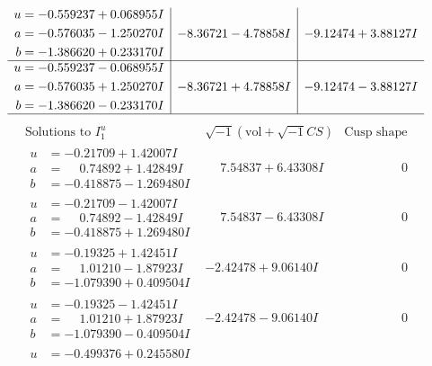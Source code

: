 \documentclass[1p]{elsarticle_modified}
\theoremstyle{definition}
\newcommand{\I}{\sqrt{-1}}
\begin{document}
$$\begin{array}{c|c|c}
\begin{aligned}
u &= -0.559237 + 0.068955 I \\
a &= -0.576035 - 1.250270 I \\
b &= -1.386620 + 0.233170 I\end{aligned}
 & -8.36721 - 4.78858 I & -9.12474 + 3.88127 I \\ \hline\begin{aligned}
u &= -0.559237 - 0.068955 I \\
a &= -0.576035 + 1.250270 I \\
b &= -1.386620 - 0.233170 I\end{aligned}
 & -8.36721 + 4.78858 I & -9.12474 - 3.88127 I\\
 \hline 
 \end{array}$$\newpage$$\begin{array}{c|c|c}  
\text{Solutions to }I^u_{1}& \I (\text{vol} + \sqrt{-1}CS) & \text{Cusp shape}\\
 \hline 
\begin{aligned}
u &= -0.21709 + 1.42007 I \\
a &= \phantom{-}0.74892 + 1.42849 I \\
b &= -0.418875 - 1.269480 I\end{aligned}
 & \phantom{-}7.54837 + 6.43308 I & \phantom{-0.000000 } 0 \\ \hline\begin{aligned}
u &= -0.21709 - 1.42007 I \\
a &= \phantom{-}0.74892 - 1.42849 I \\
b &= -0.418875 + 1.269480 I\end{aligned}
 & \phantom{-}7.54837 - 6.43308 I & \phantom{-0.000000 } 0 \\ \hline\begin{aligned}
u &= -0.19325 + 1.42451 I \\
a &= \phantom{-}1.01210 - 1.87923 I \\
b &= -1.079390 + 0.409504 I\end{aligned}
 & -2.42478 + 9.06140 I & \phantom{-0.000000 } 0 \\ \hline\begin{aligned}
u &= -0.19325 - 1.42451 I \\
a &= \phantom{-}1.01210 + 1.87923 I \\
b &= -1.079390 - 0.409504 I\end{aligned}
 & -2.42478 - 9.06140 I & \phantom{-0.000000 } 0 \\ \hline\begin{aligned}
u &= -0.499376 + 0.245580 I \\

\end{aligned}
\end{array}$$
\end{document}
